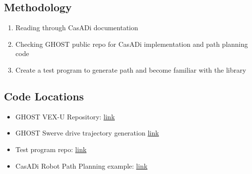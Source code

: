 \subsection*{Methodology}
\begin{enumerate}
    \item Reading through CasADi documentation
    \item Checking GHOST public repo for CasADi implementation and path planning code
    \item Create a test program to generate path and become familiar with the library
\end{enumerate}

\subsection*{Code Locations}
\begin{itemize}
    \item GHOST VEX-U Repository: \href{https://github.com/VEXU-GHOST/VEXU_GHOST}{link}
    \item GHOST Swerve drive trajectory generation \href{https://github.com/VEXU-GHOST/VEXU_GHOST/blob/develop/11_Robots/ghost_swerve_mpc_planner/src/casadi_swerve_model_generation.cpp}{link}
    \item Test program repo: \href{https://github.com/satsinush/CasADi-Test.git}{link}
    \item CasADi Robot Path Planning example: \href{https://github.com/tianchenji/path-planning.git}{link}
\end{itemize}

